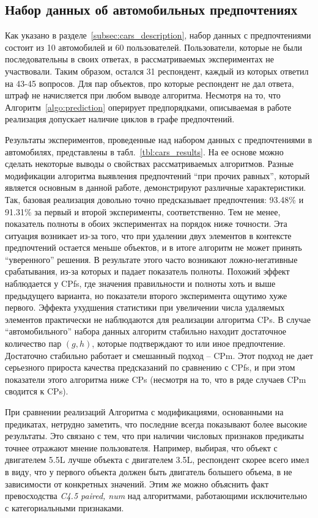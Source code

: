 	\subsection{Набор данных об автомобильных предпочтениях}
	\label{subsec:exp_cars}
		Как указано в разделе~\ref{subsec:cars_description}, набор данных с предпочтениями состоит из 10 автомобилей и 60 пользователей. Пользователи, которые не были последовательны в своих ответах, в рассматриваемых экспериментах не участвовали. Таким образом, остался 31 респондент, каждый из которых ответил на 43-45 вопросов. Для пар объектов, про которые респондент не дал ответа, штраф не начисляется при любом выводе алгоритма. Несмотря на то, что Алгоритм~\ref{algo:prediction} оперирует предпорядками, описываемая в работе реализация допускает наличие циклов в графе предпочтений.
	
		Результаты экспериментов, проведенные над набором данных с предпочтениями в автомобилях, представлены в табл.~\ref{tbl:cars_results}. На ее основе можно сделать некоторые выводы о свойствах рассматриваемых алгоритмов. Разные модификации алгоритма выявления предпочтений \enquote{при прочих равных}, который является основным в данной работе, демонстрируют различные характеристики. Так, базовая реализация довольно точно предсказывает предпочтения: 93.48\% и 91.31\% за первый и второй эксперименты, соответственно. Тем не менее, показатель полноты в обоих экспериментах на порядок ниже точности. Эта ситуация возникает из-за того, что при удалении двух элементов в контексте предпочтений остается меньше объектов, и в итоге алгоритм не может принять ``уверенного'' решения. В результате этого часто возникают ложно-негативные срабатывания, из-за которых и падает показатель полноты. Похожий эффект наблюдается у CPfs, где значения правильности и полноты хоть и выше предыдущего варианта, но показатели второго эксперимента ощутимо хуже первого. Эффекта ухудшения статистики при увеличении числа удаляемых элементов практически не наблюдаются для реализации алгоритма CPs. В случае ``автомобильного'' набора данных алгоритм стабильно находит достаточное количество пар $(g,h)$, которые подтверждают то или иное предпочтение. Достаточно стабильно работает и смешанный подход – CPm. Этот подход не дает серьезного прироста качества предсказаний по сравнению с CPfs, и при этом показатели этого алгоритма ниже CPs (несмотря на то, что в ряде случаев CPm сводится к CPs).
		
		При сравнении реализаций Алгоритма с модификациями, основанными на предикатах, нетрудно заметить, что последние всегда показывают более высокие результаты. Это связано с тем, что при наличии числовых признаков предикаты точнее отражают мнение пользователя. Например, выбирая, что объект с двигателем 5.5L лучше объекта с двигателем 3.5L, респондент скорее всего имел в виду, что у первого объекта должен быть двигатель большего объема, в не зависимости от конкретных значений. Этим же можно объяснить факт превосходства \emph{C4.5 paired, num} над алгоритмами, работающими исключительно с категориальными признаками.  
		
